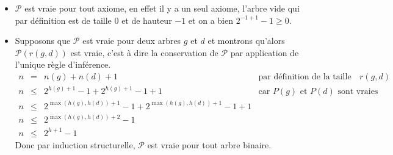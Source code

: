 \documentclass[11pt,a4paper]{article}
\begin{document}
\begin{Exercise}[title={Questions de cours : preuve par induction structurelle}]
{\begin{itemize}
    \item $\mathcal{P}$ est vraie pour tout axiome, en effet il y a un seul axiome, l'arbre vide qui par définition est de taille 0 et de hauteur $-1$ et on a bien $2^{-1 + 1} -1 \geqslant 0 $.
    \item Supposons que $\mathcal{P}$ est vraie pour deux arbres $g$ et $d$ et montrons qu'alors $\mathcal{P}(r(g,d))$ est vraie, c'est à dire la conservation de $\mathcal{P}$ par application de l'unique règle d'inférence. \\
    $\begin{array}{lcll}
      n & = & n(g) + n(d) + 1 & \text{par définition de la taille de }r(g,d)   \\
      n & \leqslant & 2^{h(g) + 1} -1 + 2^{h(g) + 1} -1 + 1  & \text{car $P(g)$ et $P(d)$ sont vraies} \\
      n & \leqslant & 2^{\max(h(g),h(d)) + 1} -1 + 2^{\max(h(g),h(d)) + 1} -1 + 1  &  \\
      n & \leqslant & 2^{\max(h(g),h(d)) + 2} - 1 &  \\
      n & \leqslant & 2^{h+1} -1
    \end{array}$
    Donc par induction structurelle,  $\mathcal{P}$ est vraie pour tout arbre binaire.
  \end{itemize}

  }
\end{Exercise}
\end{document}
